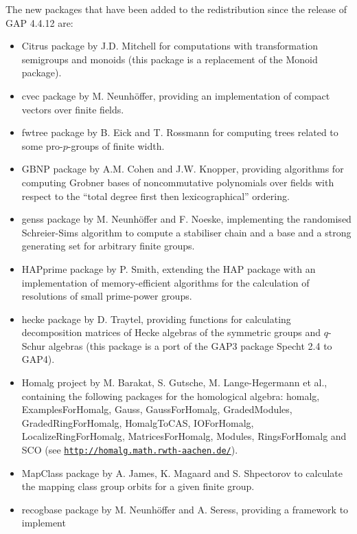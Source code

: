 \documentclass[a4paper,11pt]{report}
\begin{document}
{{{ The new packages that have been added to the redistribution since the release
of \textsf{GAP} 4.4.12 are: 
\begin{itemize}
\item  \textsf{Citrus} package by J.D. Mitchell for computations with transformation semigroups and
monoids (this package is a replacement of the \textsf{Monoid} package). 
\item  \textsf{cvec} package by M. Neunh{\"o}ffer, providing an implementation of compact vectors
over finite fields. 
\item  \textsf{fwtree} package by B. Eick and T. Rossmann for computing trees related to some pro-$p$-groups of finite width. 
\item  \textsf{GBNP} package by A.M. Cohen and J.W. Knopper, providing algorithms for computing
Grobner bases of noncommutative polynomials over fields with respect to the ``total degree first then lexicographical'' ordering. 
\item  \textsf{genss} package by M. Neunh{\"o}ffer and F. Noeske, implementing the randomised
Schreier-Sims algorithm to compute a stabiliser chain and a base and a strong
generating set for arbitrary finite groups. 
\item  \textsf{HAPprime} package by P. Smith, extending the \textsf{HAP} package with an implementation of memory-efficient algorithms for the
calculation of resolutions of small prime-power groups. 
\item  \textsf{hecke} package by D. Traytel, providing functions for calculating decomposition
matrices of Hecke algebras of the symmetric groups and $q$-Schur algebras (this package is a port of the \textsf{GAP}{\nobreakspace}3 package \textsf{Specht 2.4} to \textsf{GAP}{\nobreakspace}4). 
\item  \textsf{Homalg} project by M. Barakat, S. Gutsche, M. Lange-Hegermann et al., containing the
following packages for the homological algebra: \textsf{homalg}, \textsf{ExamplesForHomalg}, \textsf{Gauss}, \textsf{GaussForHomalg}, \textsf{GradedModules}, \textsf{GradedRingForHomalg}, \textsf{HomalgToCAS}, \textsf{IO{\textunderscore}ForHomalg}, \textsf{LocalizeRingForHomalg}, \textsf{MatricesForHomalg}, \textsf{Modules}, \textsf{RingsForHomalg} and \textsf{SCO} (see \href{http://homalg.math.rwth-aachen.de/} {\texttt{http://homalg.math.rwth-aachen.de/}}). 
\item  \textsf{MapClass} package by A. James, K. Magaard and S. Shpectorov to calculate the mapping
class group orbits for a given finite group. 
\item  \textsf{recogbase} package by M. Neunh{\"o}ffer and A. Seress, providing a framework to implement

\end{itemize}}}}
\end{document}

